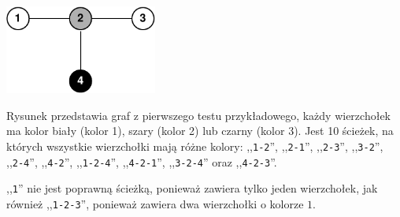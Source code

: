 \section*{}

\includegraphics[width=5cm]{pathsfig.pdf}

Rysunek przedstawia graf z pierwszego testu przykładowego, każdy wierzchołek ma kolor biały (kolor 1), szary (kolor 2) lub czarny (kolor 3).
Jest 10 ścieżek, na których wszystkie wierzchołki mają różne kolory:
,,\texttt{1-2}'', ,,\texttt{2-1}'', ,,\texttt{2-3}'', ,,\texttt{3-2}'', ,,\texttt{2-4}'', ,,\texttt{4-2}'', ,,\texttt{1-2-4}'', ,,\texttt{4-2-1}'', ,,\texttt{3-2-4}'' oraz ,,\texttt{4-2-3}''.

,,\texttt{1}'' nie jest poprawną ścieżką, ponieważ zawiera tylko jeden wierzchołek, jak również
,,\texttt{1-2-3}'', ponieważ zawiera dwa wierzchołki o kolorze $1$.
